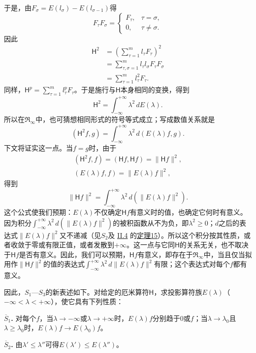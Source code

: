 \documentclass[fontsize=13pt,twoside,openany,headings=normal,parskip=false,bookmarkpackage=false,DIV=calc]{scrbook}
\begin{document}
\hypertarget{origpage-61}{}\label{origpage-61}于是，由$F_\sigma=E(l_\sigma)-E(l_{\sigma-1})$得
\[
F_\tau F_\sigma=\begin{cases}F_\tau,&\tau=\sigma,\\0,&\tau\ne\sigma.\end{cases}
\]
因此
\begin{align*}
\mathsf H^2&=\left(\sum_{\tau=1}^m l_\tau F_\tau\right)^2\\
&=\sum_{\tau,\sigma=1}^m l_\tau l_\sigma F_\tau F_\sigma\\
&=\sum_{\tau=1}^m l_\tau^2F_\tau.
\end{align*}
同样，$\mathsf H^p=\sum_{\tau=1}^ml_\tau^pF_\tau$。于是施行与$\mathsf H$本身相同的变换，得到
\[
\mathsf H^2=\int_{-\infty}^{+\infty}\lambda^2\,dE(\lambda).
\]
所以在$\mathfrak{R}_\infty$中，也可猜想相同形式的符号等式成立；写成数值关系就是
\[
(\mathsf H^2f,g)=\int_{-\infty}^{+\infty}\lambda^2\,d(E(\lambda)f,g).
\]
下文将证实这一点。当$f=g$时，由于
\begin{gather*}
(\mathsf H^2f,f)=(\mathsf Hf,\mathsf Hf)=\|\mathsf Hf\|^2,\\
(E(\lambda)f,f)=\|E(\lambda)f\|^2,
\end{gather*}
得到
\[
\|\mathsf Hf\|^2=\int_{-\infty}^{+\infty}\lambda^2\,d(\|E(\lambda)f\|^2).
\]
这个公式使我们预期：$E(\lambda)$不仅确定$\mathsf Hf$有意义时的值，也确定它何时有意义。因为积分$\int_{-\infty}^{+\infty}\lambda^2\,d(\|E(\lambda)f\|^2)$的被积函数从不为负，即$\lambda^2\geq0$；$d$之后的表达式$\|E(\lambda)f\|^2$又不递减（见$\hyperref[cond:II.S2]{S_2}$及 \hyperref[sec:II.4]{II.4} 的\CJKglue \hyperref[thm:II.15]{定理15}）。所以这个积分按其性质，或者收敛于零或有限正值，或者发散到$+\infty$。这一点与它同$\mathsf H$的关系无关，也不取决于$\mathsf Hf$是否有意义。因此，我们可以预期，$\mathsf Hf$有意义，即存在于$\mathfrak{R}_\infty$中，当且仅当拟用作$\|\mathsf Hf\|^2$的值的表达式$\int_{-\infty}^{+\infty}\lambda^2\,d\|E(\lambda)f\|^2$有限；这个表达式对每个$f$都有意义。

因此，$\hyperref[cond:II.S1]{S_1}$—$\hyperref[cond:II.S3]{S_3}$的新表述如下。对给定的厄米算符$\mathsf H$，求投影算符族$E(\lambda)$（$-\infty<\lambda<+\infty$），使它具有下列性质：

\leavevmode{}\textbf{$\overline{S}_1$.}\label{cond:II.Sbar1} 对每个$f$，当$\lambda\to-\infty$或$\lambda\to+\infty$时，$E(\lambda)f$分别趋于$0$或$f$；当$\lambda\to\lambda_0$且$\lambda\geq\lambda_0$时，$E(\lambda)f\to E(\lambda_0)f$。

\leavevmode{}\textbf{$\overline{S}_2$.}\label{cond:II.Sbar2} 由$\lambda'\leq\lambda''$可得$E(\lambda')\leq E(\lambda'')$。
\end{document}

